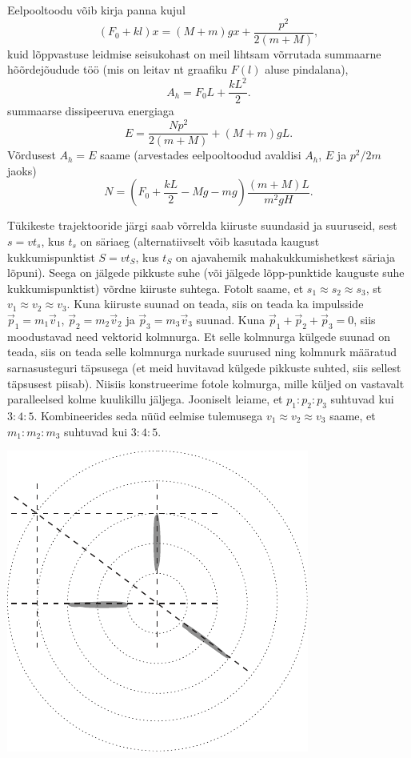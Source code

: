 \documentclass[10pt, twoside]{article}
\begin{document}
{Eelpooltoodu võib kirja panna kujul
\[
(F_0 + kl)x = (M + m) gx + \frac{p^2}{2(m+M)},
\]
kuid lõppvastuse leidmise seisukohast on meil lihtsam võrrutada summaarne hõõrdejõudude töö (mis on leitav nt graafiku $F(l)$ aluse pindalana),
\[
A_h = F_0L + \frac{kL^2}{2}.
\]
summaarse dissipeeruva energiaga
\[
E=\frac{N p^{2}}{2(m+M)}+(M+m) g L.
\]
Võrdusest $A_h = E$ saame (arvestades eelpooltoodud avaldisi $A_h$, $E$ ja $p^2/2m$ jaoks)
\[
N=\left(F_{0}+\frac{k L}{2}-M g-m g\right) \frac{(m+M) L}{m^{2} g H}.
\]
\probend
\bigskip


\solu
Tükikeste trajektooride järgi saab võrrelda kiiruste suundasid ja suuruseid, sest $s = vt_s$, kus $t_s$ on säriaeg (alternatiivselt võib kasutada kaugust kukkumispunktist $S = vt_S$, kus $t_S$ on ajavahemik mahakukkumishetkest säriaja lõpuni). Seega on jälgede pikkuste suhe (või jälgede lõpp-punktide kauguste suhe kukkumispunktist) võrdne kiiruste suhtega. Fotolt saame, et $s_1 \approx s_2 \approx s_3$, st $v_1 \approx v_2 \approx v_3$. Kuna kiiruste suunad on teada, siis on teada ka impulsside $\vec p_1 = m_1\vec v_1$, $\vec p_2 = m_2\vec v_2$ ja $\vec p_3 = m_3\vec v_3$ suunad. Kuna $\vec p_1 + \vec p_2 + \vec p_3 = 0$, siis moodustavad need vektorid kolmnurga. Et selle kolmnurga külgede suunad on teada, siis on teada selle kolmnurga nurkade suurused ning kolmnurk määratud sarnasusteguri täpsusega (et meid huvitavad külgede pikkuste suhted, siis sellest täpsusest piisab). Niisiis konstrueerime fotole kolmurga, mille küljed on vastavalt paralleelsed kolme kuulikillu jäljega. Jooniselt leiame, et $p_1 : p_2 : p_3$ suhtuvad kui $3 : 4 : 5$. Kombineerides seda nüüd eelmise tulemusega $v_1 \approx v_2 \approx v_3$ saame, et $m_1 : m_2 : m_3$ suhtuvad kui $3 : 4 : 5$.
\begin{center}
	\includegraphics[width=0.6\linewidth]{2008-v2g-06-lah}
\end{center}
\probend
\bigskip

}
\end{document}

